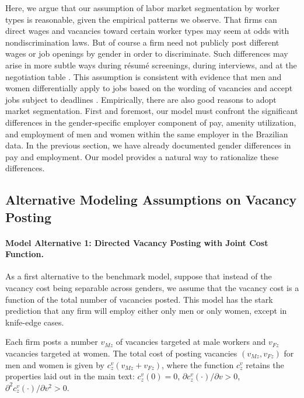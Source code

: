 Here, we argue that our assumption of labor market segmentation by worker types is reasonable, given the empirical patterns we observe. %
%
That firms can direct wages and vacancies toward certain worker types may seem at odds with nondiscrimination laws. But of course a firm need not publicly post different wages or job openings by gender in order to discriminate. Such differences may arise in more subtle ways during r\'{e}sum\'{e} screenings, during interviews, and at the negotiation table \citep{GoldinRouse2000}. This assumption is consistent with evidence that men and women differentially apply to jobs based on the wording of vacancies \citep{AbrahamHallermeierStein2024} and accept jobs subject to deadlines \citep{CortesPanPilossophReubenZafar2023}. %
%
Empirically, there are also good reasons to adopt market segmentation. First and foremost, our model must confront the significant differences in the gender-specific employer component of pay, amenity utilization, and employment of men and women within the same employer in the Brazilian data. In the previous section, we have already documented gender differences in pay and employment. Our model provides a natural way to rationalize these differences.


\subsection{Alternative Modeling Assumptions on Vacancy Posting\label{app:alternative_vacancy_models}}

\paragraph{Model Alternative 1: Directed Vacancy Posting with Joint Cost Function.} %

As a first alternative to the benchmark model, suppose that instead of the vacancy cost being separable across genders, we assume that the vacancy cost is a function of the total number of vacancies posted. This model has the stark prediction that any firm will employ either only men or only women, except in knife-edge cases.

Each firm posts a number $v_{Mz}$ of vacancies targeted at male workers and $v_{Fz}$ vacancies targeted at women. The total cost of posting vacancies $(v_{Mz},v_{Fz})$ for men and women is given by $c_{z}^{v}(v_{Mz} + v_{Fz})$, where the function $c_{z}^{v}$ retains the properties laid out in the main text: $c_{z}^{v}(0) = 0$, $\partial c_{z}^{v}(\cdot) / \partial v > 0$, $\partial^2 c_{z}^{v}(\cdot) / \partial v^2  > 0$.

